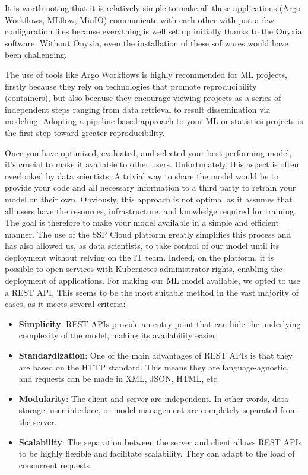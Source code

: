 It is worth noting that it is relatively simple to make all these applications (Argo Workflows, MLflow, MinIO) communicate with each other with just a few configuration files because everything is well set up initially thanks to the Onyxia software. Without Onyxia, even the installation of these softwares would have been challenging.

The use of tools like Argo Workflows is highly recommended for ML projects, firstly because they rely on technologies that promote reproducibility (containers), but also because they encourage viewing projects as a series of independent steps ranging from data retrieval to result dissemination via modeling. Adopting a pipeline-based approach to your ML or statistics projects is the first step toward greater reproducibility.


Once you have optimized, evaluated, and selected your best-performing model, it's crucial to make it available to other users. Unfortunately, this aspect is often overlooked by data scientists. A trivial way to share the model would be to provide your code and all necessary information to a third party to retrain your model on their own. Obviously, this approach is not optimal as it assumes that all users have the resources, infrastructure, and knowledge required for training. The goal is therefore to make your model available in a simple and efficient manner. The use of the SSP Cloud platform greatly simplifies this process and has also allowed us, as data scientists, to take control of our model until its deployment without relying on the IT team. Indeed, on the platform, it is possible to open services with Kubernetes administrator rights, enabling the deployment of applications. For making our ML model available, we opted to use a REST API. This seems to be the most suitable method in the vast majority of cases, as it meets several criteria:

\begin{itemize}
    \item \textbf{Simplicity}: REST APIs provide an entry point that can hide the underlying complexity of the model, making its availability easier.
    \item \textbf{Standardization}: One of the main advantages of REST APIs is that they are based on the HTTP standard. This means they are language-agnostic, and requests can be made in XML, JSON, HTML, etc.
    \item \textbf{Modularity}: The client and server are independent. In other words, data storage, user interface, or model management are completely separated from the server.
    \item \textbf{Scalability}: The separation between the server and client allows REST APIs to be highly flexible and facilitate scalability. They can adapt to the load of concurrent requests.
\end{itemize}

